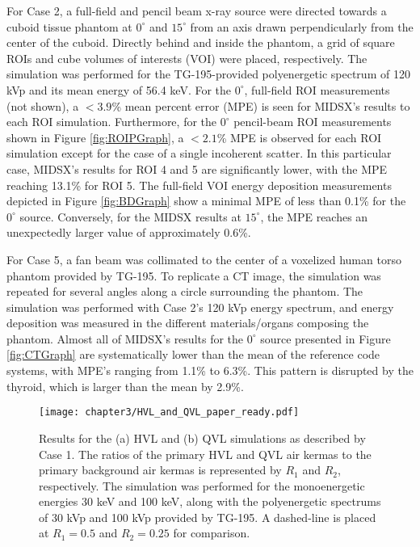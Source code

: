 \par For Case 2, a full-field and pencil beam x-ray source were directed towards a cuboid tissue phantom at $0^\circ$ and $15^\circ$ from an axis drawn perpendicularly from the center of the cuboid. Directly behind and inside the phantom, a grid of square ROIs and cube volumes of interests (VOI) were placed, respectively. The simulation was performed for the TG-195-provided polyenergetic spectrum of 120 kVp and its mean energy of 56.4 keV. For the $0^\circ$, full-field ROI measurements (not shown), a $<3.9$\% mean percent error (MPE) is seen for MIDSX's results to each ROI simulation. Furthermore, for the $0^\circ$ pencil-beam ROI measurements shown in Figure \ref{fig:ROIPGraph}, a $<2.1$\% MPE is observed for each ROI simulation except for the case of a single incoherent scatter. In this particular case, MIDSX's results for ROI 4 and 5 are significantly lower, with the MPE reaching 13.1\% for ROI 5. The full-field VOI energy deposition measurements depicted in Figure \ref{fig:BDGraph} show a minimal MPE of less than 0.1\% for the $0^\circ$ source. Conversely, for the MIDSX results at $15^\circ$, the MPE reaches an unexpectedly larger value of approximately 0.6\%.
\par For Case 5, a fan beam was collimated to the center of a voxelized human torso phantom provided by TG-195. To replicate a CT image, the simulation was repeated for several angles along a circle surrounding the phantom. The simulation was performed with Case 2's 120 kVp energy spectrum, and energy deposition was measured in the different materials/organs composing the phantom. Almost all of MIDSX's results for the $0^\circ$ source presented in Figure \ref{fig:CTGraph} are systematically lower than the mean of the reference code systems, with MPE's ranging from 1.1\% to 6.3\%. This pattern is disrupted by the thyroid, which is larger than the mean by 2.9\%. 


\begin{figure}[H]
    \centering
	\texttt{[image: chapter3/HVL\_and\_QVL\_paper\_ready.pdf]}
	\caption{Results for the (a) HVL and (b) QVL simulations as described by Case 1. The ratios of the primary HVL and QVL air kermas to the primary background air kermas is represented by $R_1$ and $R_2$, respectively. The simulation was performed for the monoenergetic energies 30 keV and 100 keV, along with the polyenergetic spectrums of 30 kVp and 100 kVp provided by TG-195. A dashed-line is placed at $R_1 = 0.5$ and $R_2 = 0.25$ for comparison.}
	\label{fig:HVLGraph}
\end{figure}

